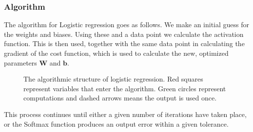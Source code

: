 \documentclass[11pt,a4paper,titlepage]{article}
\begin{document}
\subsubsection{Algorithm}
The algorithm for Logistic regression goes as follows. We make an initial guess for the weights and biases. Using these and a data point we calculate the activation function. This is then used, together with the same data point in calculating the gradient of the cost function, which is used to calculate the new, optimized parameters $\textbf{W}$ and $\textbf{b}$.
\begin{figure}[H]
\begin{center}
\end{center}
\caption[Logistic regression algorithm]{The algorithmic structure of logistic regression. Red squares represent variables that enter the algorithm. Green circles represent computations and dashed arrows means the output is used once.}
\label{LogisticRegressionFlowchart}
\end{figure}
This process continues until either a given number of iterations have taken place, or the Softmax function produces an output error within a given tolerance. 
\end{document}
